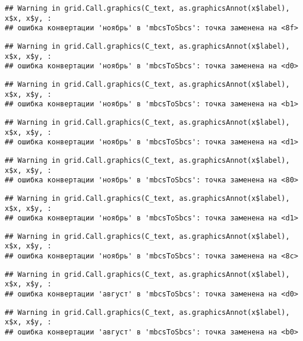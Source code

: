 \documentclass[
]{article}
\begin{document}
\begin{verbatim}
## Warning in grid.Call.graphics(C_text, as.graphicsAnnot(x$label), x$x, x$y, :
## ошибка конвертации 'ноябрь' в 'mbcsToSbcs': точка заменена на <8f>
\end{verbatim}

\begin{verbatim}
## Warning in grid.Call.graphics(C_text, as.graphicsAnnot(x$label), x$x, x$y, :
## ошибка конвертации 'ноябрь' в 'mbcsToSbcs': точка заменена на <d0>
\end{verbatim}

\begin{verbatim}
## Warning in grid.Call.graphics(C_text, as.graphicsAnnot(x$label), x$x, x$y, :
## ошибка конвертации 'ноябрь' в 'mbcsToSbcs': точка заменена на <b1>
\end{verbatim}

\begin{verbatim}
## Warning in grid.Call.graphics(C_text, as.graphicsAnnot(x$label), x$x, x$y, :
## ошибка конвертации 'ноябрь' в 'mbcsToSbcs': точка заменена на <d1>
\end{verbatim}

\begin{verbatim}
## Warning in grid.Call.graphics(C_text, as.graphicsAnnot(x$label), x$x, x$y, :
## ошибка конвертации 'ноябрь' в 'mbcsToSbcs': точка заменена на <80>
\end{verbatim}

\begin{verbatim}
## Warning in grid.Call.graphics(C_text, as.graphicsAnnot(x$label), x$x, x$y, :
## ошибка конвертации 'ноябрь' в 'mbcsToSbcs': точка заменена на <d1>
\end{verbatim}

\begin{verbatim}
## Warning in grid.Call.graphics(C_text, as.graphicsAnnot(x$label), x$x, x$y, :
## ошибка конвертации 'ноябрь' в 'mbcsToSbcs': точка заменена на <8c>
\end{verbatim}

\begin{verbatim}
## Warning in grid.Call.graphics(C_text, as.graphicsAnnot(x$label), x$x, x$y, :
## ошибка конвертации 'август' в 'mbcsToSbcs': точка заменена на <d0>
\end{verbatim}

\begin{verbatim}
## Warning in grid.Call.graphics(C_text, as.graphicsAnnot(x$label), x$x, x$y, :
## ошибка конвертации 'август' в 'mbcsToSbcs': точка заменена на <b0>
\end{verbatim}
\end{document}
